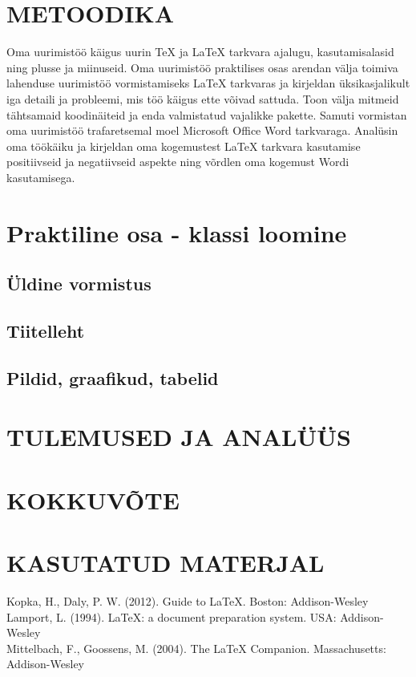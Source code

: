 \documentclass{21kuur}
\begin{document}
\chapter{METOODIKA}
Oma uurimist\"{o}\"{o} k\"{a}igus uurin TeX ja LaTeX tarkvara ajalugu, kasutamisalasid ning plusse ja miinuseid. Oma uurimist\"{o}\"{o} praktilises osas arendan v\"{a}lja toimiva lahenduse uurimist\"{o}\"{o} vormistamiseks LaTeX tarkvaras ja kirjeldan \"{u}ksikasjalikult iga detaili ja probleemi, mis t\"{o}\"{o} k\"{a}igus ette v\~{o}ivad sattuda. Toon v\"{a}lja mitmeid t\"{a}htsamaid koodin\"{a}iteid ja enda valmistatud vajalikke pakette. Samuti vormistan oma uurimist\"{o}\"{o} trafaretsemal moel Microsoft Office Word tarkvaraga. Anal\"{u}sin oma t\"{o}\"{o}k\"{a}iku ja kirjeldan oma kogemustest LaTeX tarkvara kasutamise positiivseid ja negatiivseid aspekte ning v\~{o}rdlen oma kogemust Wordi kasutamisega.

\chapter{Praktiline osa - klassi loomine}
\section{Üldine vormistus}
\section{Tiitelleht}
\section{Pildid, graafikud, tabelid}

\chapter{TULEMUSED JA ANALÜÜS}

\chapter{KOKKUVÕTE}

\chapter{KASUTATUD MATERJAL}
Kopka, H., Daly, P. W. (2012). Guide to LaTeX. Boston: Addison-Wesley
\\Lamport, L. (1994). LaTeX: a document preparation system. USA: Addison-Wesley
\\Mittelbach, F., Goossens, M. (2004). The LaTeX Companion. Massachusetts: Addison-Wesley
\end{document}

